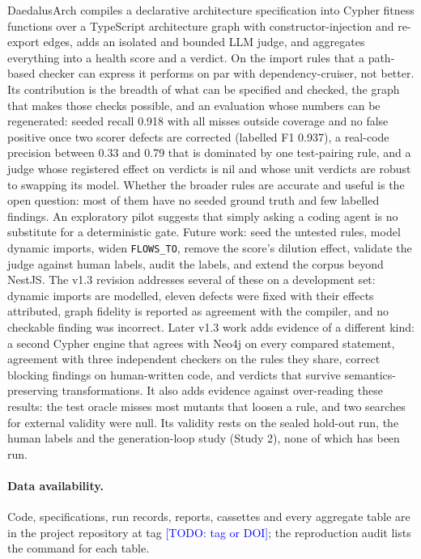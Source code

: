 \documentclass[10pt,a4paper]{article}
\newcommand{\todo}[1]{\textcolor{blue}{[TODO: #1]}}
\newcommand{\tool}{DaedalusArch}
\newcommand{\dc}{dependency-cruiser}
\newcommand{\edge}[1]{\texttt{\small #1}}
\begin{document}
\tool{} compiles a declarative architecture specification into Cypher fitness functions over a TypeScript
architecture graph with constructor-injection and re-export edges, adds an isolated and bounded LLM judge, and
aggregates everything into a health score and a verdict. On the import rules that a path-based checker can express it
performs on par with \dc{}, not better. Its contribution is the breadth of what can be specified and checked, the
graph that makes those checks possible, and an evaluation whose numbers can be regenerated: seeded recall 0.918 with
all misses outside coverage and no false positive once two scorer defects are corrected (labelled F1 0.937), a
real-code precision between 0.33 and 0.79 that is dominated by one test-pairing rule, and a judge whose registered
effect on verdicts is nil and whose unit verdicts are robust to swapping its model. Whether the broader rules are
accurate and useful is the open question: most of them have no seeded ground truth and few labelled findings. An
exploratory pilot suggests that simply asking a coding agent is no substitute for a deterministic gate. Future
work: seed the untested rules, model dynamic imports, widen \edge{FLOWS\_TO}, remove the score's dilution effect,
validate the judge against human labels, audit the labels, and extend the corpus beyond NestJS.
The v1.3 revision addresses several of these on a development set: dynamic imports are modelled, eleven defects
were fixed with their effects attributed, graph fidelity is reported as agreement with the compiler, and no
checkable finding was incorrect. Later v1.3 work adds evidence of a different kind: a second Cypher engine
that agrees with Neo4j on every compared statement, agreement with three independent checkers on the rules they
share, correct blocking findings on human-written code, and verdicts that survive semantics-preserving
transformations. It also adds evidence against over-reading these results: the test oracle misses most mutants that
loosen a rule, and two searches for external validity were null. Its validity rests on the sealed hold-out run, the
human labels and the generation-loop study (Study 2), none of which has been run.

\paragraph{Data availability.}
Code, specifications, run records, reports, cassettes and every aggregate table are in the project repository at tag
\todo{tag or DOI}; the reproduction audit lists the command for each table.



\end{document}
